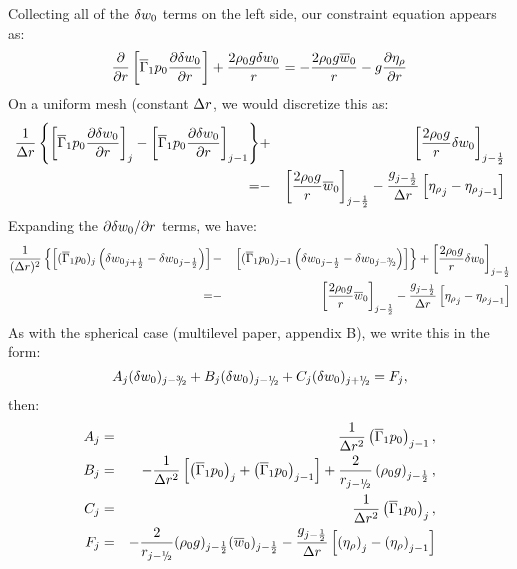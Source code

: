 Collecting all of the $\delta w_0$ terms on the left side, our constraint equation
appears as:
\begin{equation}
\frac{\partial}{\partial r} \left [ \overline{\Gamma}_1 p_0 \frac{\partial \delta w_0}{\partial r} \right ]
 + \frac{2 \rho_0 g \delta w_0}{r} = -\frac{2 \rho_0 g \overline{w}_0}{r} - g \frac{\partial \eta_{\rho}}{\partial r}
\end{equation}
%
On a uniform mesh (constant $\Delta r$, we would discretize this as:
\begin{eqnarray}
\frac{1}{\Delta r} \left \{ \left [ \overline{\Gamma}_1 p_0 \frac{\partial \delta w_0}{\partial r} \right ]_j
                     - \left [ \overline{\Gamma}_1 p_0 \frac{\partial \delta w_0}{\partial r} \right ]_{j-1}
              \right \}
            &+& \left [ \frac{2 \rho_0 g}{r} \delta w_0 \right ]_{j-\frac{1}{2}} \nonumber \\
            = &-& \left [ \frac{2 \rho_0 g}{r} \overline{w}_0 \right ]_{j-\frac{1}{2}}
              - \frac{g_{j-\frac{1}{2}}}{\Delta r} \left [ {\eta_{\rho}}_j - {\eta_{\rho}}_{j-1} \right ]
\end{eqnarray}
Expanding the $\partial \delta w_0 / \partial r$ terms, we have:
\begin{eqnarray}
\frac{1}{(\dr)^2} \left \{ \left [ (\gammabar p_0)_j
                               \left ({\dw}_{j+\half} - {\dw}_{j-\half} \right ) \right ]
                      \right . &-& \left . \left [ (\gammabar p_0)_{j-1}
                               \left ({\dw}_{j-\half} - {\dw}_{j-\thalf} \right ) \right ]
              \right \}
            + \left [ \frac{2 \rho_0 g}{r} \dw \right ]_{j-\half} \nonumber \\
            = &-& \left [ \frac{2 \rho_0 g}{r} \ow \right ]_{j-\half}
              - \frac{g_{j-\half}}{\dr} \left [ {\etarho}_j - {\etarho}_{j-1} \right ]
\end{eqnarray}
As with the spherical case (multilevel paper, appendix B), we write this in the form:
\begin{equation}
A_j (\dw)_{j-\thalf} + B_j (\dw)_{j-\myhalf} + C_j (\dw)_{j+\myhalf} = F_j,
\end{equation}
then:
\begin{eqnarray}
A_j &=& \frac{1}{\dr^2} \left( {\gammabar p_0}\right)_{j-1}, \\
B_j &=& -\frac{1}{\dr^2} \left[ \left( {\gammabar p_0}\right)_{j}  + \left( {\gammabar p_0}\right)_{j-1} \right] +  \frac{2}{r_{j-\myhalf}} \left (\rho_0 g \right )_{j-\half}  , \\
C_j &=& \frac{1}{\dr^2} \left( {\gammabar p_0}\right)_{j}  , \\
F_j &=&  -\frac{2}{r_{j-\myhalf}} (\rho_0 g)_{j-\half}   (\ow)_{j-\half} - \frac{g_{j-\half}}{\dr} \left[ \left( \etarho \right)_{j} - \left( \etarho \right)_{j-1} \right] 
\end{eqnarray}


